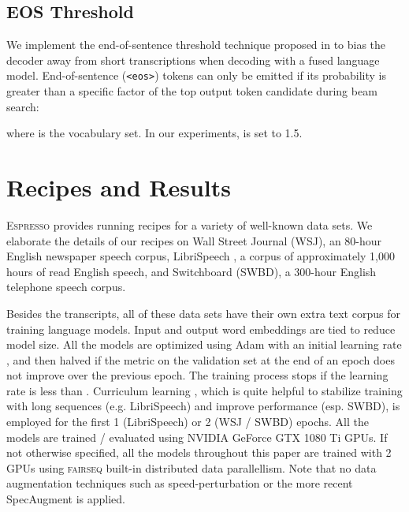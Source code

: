 \documentclass{article}
\def\espresso{\textsc{Espresso}\xspace}
\def\fairseq{\textsc{fairseq}\xspace}
\begin{document}
\subsection{EOS Threshold}
We implement the end-of-sentence threshold technique proposed in \cite{hannun2019sequence} to bias the decoder away from short transcriptions when decoding with a fused language model. End-of-sentence (\texttt{<eos>}) tokens can only be emitted if its probability is greater than a specific factor of the top output token candidate during beam search:

where  is the vocabulary set. In our experiments,  is set to 1.5.

\section{Recipes and Results}
\label{sec:res}
\espresso provides running recipes for a variety of well-known data sets. We elaborate the details of our recipes on Wall Street Journal \cite{paulb92} (WSJ), an 80-hour English newspaper speech corpus, LibriSpeech \cite{panayotovcpk15}, a corpus of approximately 1,000 hours of read English speech, and Switchboard \cite{godfrey1992switchboard} (SWBD), a 300-hour English telephone speech corpus. 

Besides the transcripts, all of these data sets have their own extra text corpus for training language models. Input and output word embeddings are tied \cite{press2017using} to reduce model size. All the models are optimized using Adam \cite{kingma2015adam} with an initial learning rate , and then halved if the metric on the validation set at the end of an epoch does not improve over the previous epoch. The training process stops if the learning rate is less than . Curriculum learning \cite{bengio2009curriculum}, which is quite helpful to stabilize training with long sequences (e.g. LibriSpeech) and improve performance (esp. SWBD), is employed for the first 1 (LibriSpeech) or 2 (WSJ / SWBD) epochs. All the models are trained / evaluated using NVIDIA GeForce GTX 1080 Ti GPUs. If not otherwise specified, all the models throughout this paper are trained with 2 GPUs using \fairseq built-in distributed data parallellism. Note that no data augmentation techniques such as speed-perturbation \cite{ko2015audio} or the more recent SpecAugment \cite{specaugment} is applied.
\end{document}

